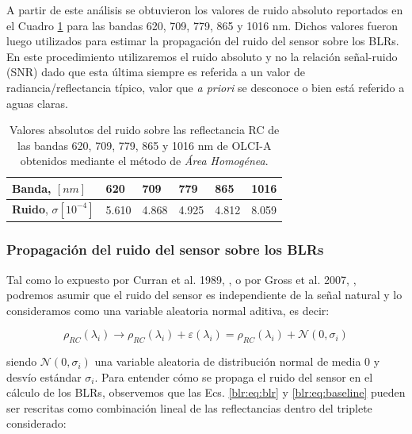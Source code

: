             A partir de este análisis se obtuvieron los valores de ruido absoluto reportados en el Cuadro \ref{blr:tab:blrNoise} para las bandas 620, 709, 779, 865 y 1016 nm. Dichos valores fueron luego utilizados para estimar la propagación del ruido del sensor sobre los BLRs.
            En este procedimiento utilizaremos el ruido absoluto y no la relación señal-ruido (SNR) dado que esta última siempre es referida a un valor de radiancia/reflectancia típico, valor que \textit{a priori} se desconoce o bien está referido a aguas claras.
            
            \begin{table}
            \caption{Valores absolutos del ruido sobre las reflectancia RC de las bandas 620, 709, 779, 865 y 1016 nm de OLCI-A obtenidos mediante el método de \textit{Área Homogénea}.}
            \begin{tabular}{|l|l|l|l|l|l|}
            \hline
            \textbf{Banda}, $[nm]$            & \textbf{620} & \textbf{709} & \textbf{779} & \textbf{865} & \textbf{1016} \\ \hline
            \textbf{Ruido}, $\sigma[10^{-4}]$ & 5.610        & 4.868        & 4.925        &  4.812       &  8.059        \\ \hline
            \end{tabular}
            \label{blr:tab:blrNoise}
            \end{table}

        \subsubsection{Propagación del ruido del sensor sobre los BLRs}
        \label{blr:s:blrNoiseBLR}
            
            Tal como lo expuesto por Curran et al. 1989, \cite{curran1989}, o por Gross et al. 2007, \cite{gross2007}, podremos asumir que el ruido del sensor es independiente de la señal natural y lo consideramos como una variable aleatoria normal aditiva, es decir:
            
            \begin{equation}
                \rho_{RC}(\lambda_{i}) \rightarrow \rho_{RC}(\lambda_{i}) + \varepsilon(\lambda_{i}) =  \rho_{RC}(\lambda_{i}) + \mathcal{N}(0,\sigma_{i})
                \label{blr:eq:rhoRCNoise}
            \end{equation}

            \noindent siendo $\mathcal{N}(0,\sigma_{i})$ una variable aleatoria de distribución normal de media $0$ y desvío estándar $\sigma_{i}$. Para entender cómo se propaga el ruido del sensor en el cálculo de los BLRs, observemos que las Ecs. \ref{blr:eq:blr} y \ref{blr:eq:baseline} pueden ser rescritas como combinación lineal de las reflectancias dentro del triplete considerado:
            
